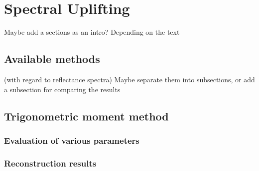 \chapter{Spectral Uplifting}

Maybe add a sections as an intro? Depending on the text

\section{Available methods}

(with regard to reflectance spectra)
Maybe separate them into subsections, or add a subsection for comparing the results

\section{Trigonometric moment method}

\subsection{Evaluation of various parameters}

\subsection{Reconstruction results}

